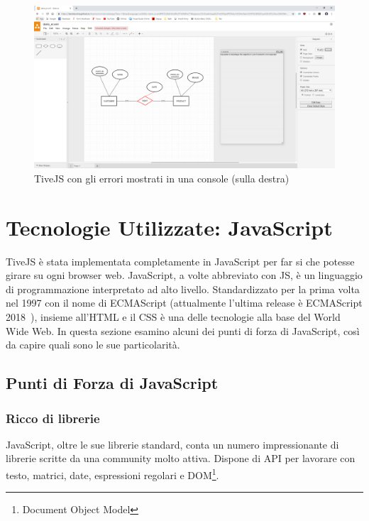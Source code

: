                \begin{figure}[htbp]
                    \centering
                    \includegraphics[scale=0.25]{Figure/semanticTranslation_error.PNG}
                    \caption{TiveJS con gli errori mostrati in una console (sulla destra)}
                    \label{fig:semanticTranslation_error}
                \end{figure}

    \section{Tecnologie Utilizzate: JavaScript}
        TiveJS è stata implementata completamente in JavaScript per far si che potesse girare su ogni browser web.
        JavaScript, a volte abbreviato con JS, è un linguaggio di programmazione interpretato ad alto livello. Standardizzato per la prima volta nel 1997 con il nome di ECMAScript (attualmente l'ultima release è ECMAScript 2018~\cite{ecmascript}), insieme all'HTML e il CSS è una delle tecnologie alla base del World Wide Web.
        In questa sezione esamino alcuni dei punti di forza di JavaScript, così da capire quali sono le sue particolarità.

        \subsection{Punti di Forza di JavaScript}

            \subsubsection{Ricco di librerie}
                JavaScript, oltre le sue librerie standard, conta un numero impressionante di librerie scritte da una community molto attiva. Dispone di API per lavorare con testo, matrici, date, espressioni regolari e DOM\footnote{Document Object Model}.

